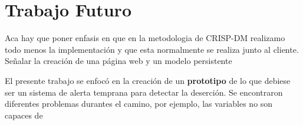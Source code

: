 \chapter{Trabajo Futuro}
\label{ch:trafu}
Aca hay que poner enfasis en que en la metodologia de CRISP-DM realizamo todo menos la implementación y que esta normalmente se realiza junto al cliente. Señalar la creación de una página web y un modelo persistente 

El presente trabajo se enfocó en la creación de un \textbf{prototipo} de lo que debiese ser un sistema de alerta temprana para detectar la deserción. Se encontraron diferentes problemas durantes el camino, por ejemplo, las variables no son capaces de 